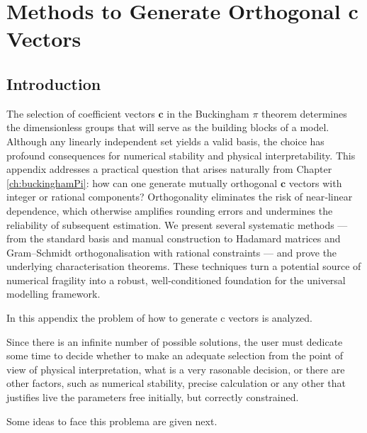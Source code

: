 \startcontents[chapter]
\chapter{Methods to Generate Orthogonal c Vectors} \label{ch:MethodsGenerateCVectors}
\minitocboxed

\section*{Introduction}
The selection of coefficient vectors $\mathbf{c}$ in the Buckingham $\pi$ theorem determines the dimensionless groups that will serve as the building blocks of a model. Although any linearly independent set yields a valid basis, the choice has profound consequences for numerical stability and physical interpretability. This appendix addresses a practical question that arises naturally from Chapter \ref{ch:buckinghamPi}: how can one generate mutually orthogonal $\mathbf{c}$ vectors with integer or rational components? Orthogonality eliminates the risk of near‑linear dependence, which otherwise amplifies rounding errors and undermines the reliability of subsequent estimation. We present several systematic methods — from the standard basis and manual construction to Hadamard matrices and Gram–Schmidt orthogonalisation with rational constraints — and prove the underlying characterisation theorems. These techniques turn a potential source of numerical fragility into a robust, well‑conditioned foundation for the universal modelling framework.

In this appendix the problem of how to generate c vectors is analyzed.

Since there is an infinite number of possible solutions, the user must dedicate some time to decide whether to make an adequate selection from the point of view of physical interpretation, what is a very rasonable decision, or there are other factors, such as numerical stability, precise calculation or any other that justifies live the parameters free initially, but correctly constrained.

Some ideas to face this problema are given next.

